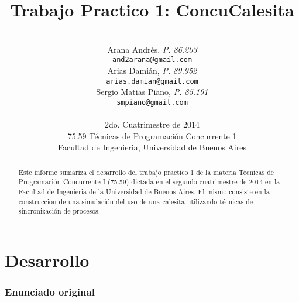 \documentclass[a4paper,11pt]{article}
\title{\textbf{Trabajo Practico 1: ConcuCalesita}}
\author{\\
  Arana Andrés, \textit{P. 86.203}                                 \\
  \texttt{and2arana@gmail.com}                                     \\ [2.5ex]
  Arias Damián, \textit{P. 89.952}                                 \\
  \texttt{arias.damian@gmail.com}                                  \\ [2.5ex]
  Sergio Matias Piano, \textit{P. 85.191}                          \\
  \texttt{smpiano@gmail.com}                                       \\ [2.5ex]
                                                                   \\
  \normalsize{2do. Cuatrimestre de 2014}                           \\
  \normalsize{75.59 Técnicas de Programación Concurrente 1}        \\
  \normalsize{Facultad de Ingenieria, Universidad de Buenos Aires} \\
}
\date{}
\begin{document}
\thispagestyle{empty}
\maketitle

\begin{abstract}

  Este informe sumariza el desarrollo del trabajo practico 1 de la materia
  Técnicas de Programación Concurrente I (75.59) dictada en el segundo
  cuatrimestre de 2014 en la Facultad de Ingenieria de la Universidad de Buenos
  Aires. El mismo consiste en la construccion de una simulación del uso de una
  calesita utilizando técnicas de sincronización de procesos.

\end{abstract}

\clearpage

\tableofcontents
\clearpage


\part{Desarrollo}

\section{Enunciado original}\label{sec:enunciado}

\end{document}
